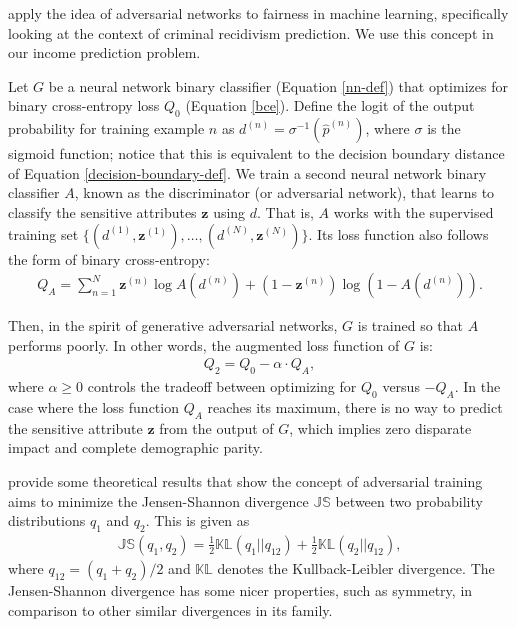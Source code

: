 \documentclass{article}
\newcommand{\bd}[1]{\boldsymbol{#1}}
\newcommand{\hp}{\hat{p}}
\newcommand{\idx}[3][]{{#2}^{(#3)}_{#1}}
\newcommand{\bidx}[3][]{\bd{#2}^{(#3)}_{#1}}
\begin{document}
\citet{wadsworth2018achieving} apply the idea of adversarial networks to fairness in machine learning, specifically looking at the context of criminal recidivism prediction.  We use this concept in our income prediction problem.  

Let $G$ be a neural network binary classifier (Equation \ref{nn-def}) that optimizes for binary cross-entropy loss $Q_0$ (Equation \ref{bce}).  Define the logit of the output probability for training example $n$ as $\idx d n = \sigma^{-1}(\idx \hp n)$, where $\sigma$ is the sigmoid function; notice that this is equivalent to the decision boundary distance of Equation \ref{decision-boundary-def}.  We train a second neural network binary classifier $A$, known as the discriminator (or adversarial network), that learns to classify the sensitive attributes $\bd z$ using $d$.  That is, $A$ works with the supervised training set $\{(\idx d 1, \bidx z 1), \ldots, (\idx d N, \bidx z N)\}$.  Its loss function also follows the form of binary cross-entropy:    
\begin{align}
Q_A = \sum_{n=1}^N \bidx z n \log A(\idx d n) + (1 - \bidx z n) \log (1 - A(\idx d n)). \label{bce}
\end{align}         

Then, in the spirit of generative adversarial networks, $G$ is trained so that $A$ performs poorly.  In other words, the augmented loss function of $G$ is:
\begin{align}
Q_2 = Q_0 - \alpha \cdot Q_A,
\end{align}
where $\alpha \geq 0$ controls the tradeoff between optimizing for $Q_0$ versus $-Q_A$.  In the case where the loss function $Q_A$ reaches its maximum, there is no way to predict the sensitive attribute $\bd z$ from the output of $G$, which implies zero disparate impact and complete demographic parity.   

\citet{goodfellow2014generative} provide some theoretical results that show the concept of adversarial training aims to minimize the Jensen-Shannon divergence $\mathbb{JS}$ between two probability distributions $q_1$ and $q_2$.  This is given as
\begin{align}
\mathbb{JS}(q_1, q_2) = \frac{1}{2} \mathbb{KL}\left(q_1 || q_{12}\right) + \frac{1}{2} \mathbb{KL}\left(q_2 || q_{12} \right),
\end{align}    
where $q_{12} = (q_1 + q_2) / 2$ and $\mathbb{KL}$ denotes the Kullback-Leibler divergence.  The Jensen-Shannon divergence has some nicer properties, such as symmetry, in comparison to other similar divergences in its family.  
\end{document}
